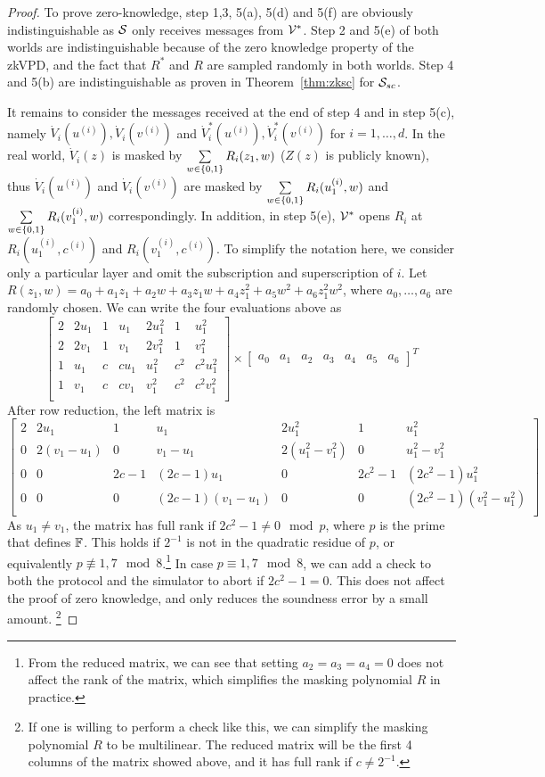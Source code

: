 \begin{proof}
To prove zero-knowledge, step 1,3, 5(a), 5(d) and 5(f) are obviously indistinguishable as $\S$ only receives messages from $\V^*$. Step 2 and 5(e) of both worlds are indistinguishable because of the zero knowledge property of the zkVPD, and the fact that $R^*$ and $R$ are sampled randomly in both worlds. Step 4 and 5(b) are indistinguishable as proven in Theorem~\ref{thm:zksc} for $\S_{sc}$.  


It remains to consider the messages received at the end of step 4 and in step 5(c), namely $\dot{V}_{i}(u^{(i)}), \dot{V}_{i}(v^{(i)})$ and $\dot{V}^*_{i}(u^{(i)}), \dot{V}^*_{i}(v^{(i)})$ for $i = 1,\ldots,d$. In the real world, $\dot{V}_{i}(z)$ is masked by $\sum\limits_{w \in\binary}R_i(z_1,w)$ ($Z(z)$ is publicly known), thus $\dot{V}_{i}(u^{(i)})$ and $\dot{V}_{i}(v^{(i)})$ are masked by $\sum\limits_{w \in\binary}R_i(u_1^{(i)},w)$ and $\sum\limits_{w \in\binary}R_i(v_1^{(i)},w)$ correspondingly. In addition, in step 5(e), $\V^*$ opens $R_i$ at $R_i(u_1^{(i)},c^{(i)})$ and $R_i(v_1^{(i)},c^{(i)})$. To simplify the notation here, we consider only a particular layer and omit the subscription and superscription of $i$. Let $R(z_1,w) = a_0+a_1z_1+a_2w+a_3z_1w+a_4z_1^2+a_5w^2+a_6z_1^2w^2$, where $a_0,\ldots,a_6$ are randomly chosen. We can write the four evaluations above as 
\[
\begin{bmatrix}
2 & 2u_1 & 1 & u_1 & 2u_1^2 & 1 & u_1^2\\
2 & 2v_1 & 1 & v_1& 2v_1^2 & 1 & v_1^2\\
1 & u_1 & c & cu_1 & u_1^2 & c^2 & c^2u_1^2\\
1 & v_1 & c & cv_1 &  v_1^2 & c^2 & c^2v_1^2\\
\end{bmatrix}
\times
\begin{bmatrix}
a_0 & a_1 &a_2 &a_3&a_4&a_5&a_6
\end{bmatrix}^T
\]
After row reduction, the left matrix is
\[
\begin{bmatrix}
2 & 2u_1 & 1 & u_1 & 2u_1^2 & 1 & u_1^2\\
0 & 2(v_1-u_1) & 0 & v_1-u_1 & 2(u_1^2-v_1^2) & 0 & u_1^2-v_1^2\\
0 & 0 & 2c-1 & (2c-1)u_1 & 0 & 2c^2-1 & (2c^2-1)u_1^2\\
0 & 0 & 0 & (2c-1)(v_1-u_1)&0 & 0 & (2c^2-1)(v_1^2-u_1^2)\\
\end{bmatrix}
\]
As $u_1\neq v_1$, the matrix has full rank if $2c^2 - 1\neq 0 \mod p$, where $p$ is the prime that defines $\F$. This holds if $2^{-1}$ is not in the quadratic residue of $p$, or equivalently $p \not\equiv 1, 7 \mod 8$.\footnote{From the reduced matrix, we can see that setting $a_2 = a_3 = a_4 = 0$ does not affect the rank of the matrix, which simplifies the masking polynomial $R$ in practice.} In case $p\equiv 1, 7 \mod 8$, we can add a check to both the protocol and the simulator to abort if $2c^2 -1 =0$. This does not affect the proof of zero knowledge, and only reduces the soundness error by a small amount. \footnote{If one is willing to perform a check like this, we can simplify the masking polynomial $R$ to be multilinear. The reduced matrix will be the first 4 columns of the matrix showed above, and it has full rank if $c\neq 2^{-1}$.}



\end{proof}
